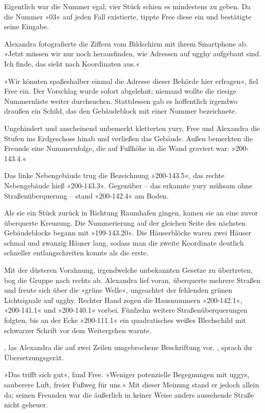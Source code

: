 Eigentlich war die Nummer egal; vier Stück schien es mindestens zu geben. Da die Nummer »03« auf jeden Fall existierte, tippte Free diese ein und bestätigte seine Eingabe. 

Alexandra fotografierte die Ziffern vom Bildschirm mit ihrem Smartphone ab. »Jetzt müssen wir nur noch herausfinden, wie Adressen auf ugghy aufgebaut sind. Ich finde, das sieht nach Koordinaten aus.«

»Wir könnten spaßeshalber einmal die Adresse dieser Behörde hier erfragen«, fiel Free ein. Der Vorschlag wurde sofort abgelehnt; niemand wollte die riesige Nummernliste weiter durchsuchen. Stattdessen gab es hoffentlich irgendwo draußen ein Schild, das den Gebäudeblock mit einer Nummer bezeichnete.

Ungehindert und anscheinend unbemerkt kletterten yury, Free und Alexandra die Stufen ins Erdgeschoss hinab und verließen das Gebäude. Außen bemerkten die Freunde eine Nummernfolge, die auf Fußhöhe in die Wand graviert war: »200-143.4.«

Das linke Nebengebäude trug die Bezeichnung »200-143.5«, das rechte Nebengebäude hieß »200-143.3«. Gegenüber – das erkannte yury mühsam ohne Straßenüberquerung – stand »200-142.4« am Boden.

Als sie ein Stück zurück in Richtung Raumhafen gingen, kamen sie an eine zuvor überquerte Kreuzung. Die Nummerierung auf der gleichen Seite des nächsten Gebäudeblocks begann mit »199-143.20«. Die Häuserblöcke waren zwei Häuser schmal und zwanzig Häuser lang, sodass man die zweite Koordinate deutlich schneller entlangschreiten konnte als die erste.

Mit der düsteren Vorahnung, irgendwelche unbekannten Gesetze zu übertreten, bog die Gruppe nach rechts ab. Alexandra lief voran, überquerte mehrere Straßen und freute sich über die »grüne Welle«, ungeachtet der fehlenden grünen Lichtsignale auf ugghy. Rechter Hand zogen die Hausnummern »200-142.1«, »200-141.1« und »200-140.1« vorbei. Fünfzehn weitere Straßenüberquerungen folgten, bis an der Ecke »200-111.1« ein quadratisches weißes Blechschild mit schwarzer Schrift vor dem Weitergehen warnte.

, las Alexandra die auf zwei Zeilen umgebrochene Beschriftung vor. , sprach ihr Übersetzungsgerät.

»Das trifft sich gut«, fand Free. »Weniger potenzielle Begegnungen mit uggys, sauberere Luft, freier Fußweg für uns.« Mit dieser Meinung stand er jedoch allein da; seinen Freunden war die äußerlich in keiner Weise anders aussehende Straße nicht geheuer.

